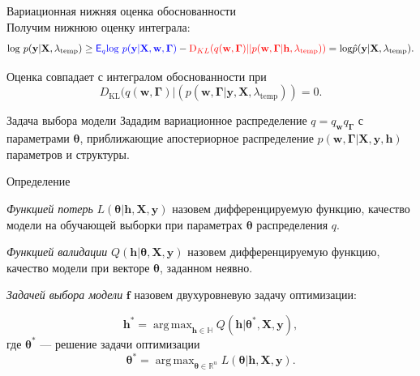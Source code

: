 \documentclass[usenames,dvipsnames,11pt,pdf,utf8,russian,aspectratio=43]{beamer}
\DeclareMathOperator*{\argmax}{arg\,max}
\begin{document}
\begin{frame}{Вариационная нижняя оценка обоснованности}
~\\Получим нижнюю оценку интеграла:
$$                                                                                                                                              
        \text{log}~p(\mathbf{y}|\mathbf{X}, \lambda_\text{temp}) \geq 
\textcolor{blue}{\mathsf{E}_q \text{log}~{p(\mathbf{y} | \mathbf{X}, \mathbf{w}, \boldsymbol{\Gamma})}} - \textcolor{red}{\text{D}_{KL}(q(\mathbf{w}, \boldsymbol{\Gamma})||p(\mathbf{w}, \boldsymbol{\Gamma}| \mathbf{h}, \lambda_\text{temp}))} = \text{log}\hat{{p}}(\mathbf{y}|\mathbf{X}, \lambda_\text{temp}).
$$ 



Оценка совпадает с интегралом обоснованности при $$D_\text{KL}(q(\mathbf{w}, \boldsymbol{\Gamma})|(p(\mathbf{w}, \boldsymbol{\Gamma}|\mathbf{y}, \mathbf{X}, \lambda_\text{temp}))=0.$$

\end{frame}      


\begin{frame}{Задача выбора модели}
\footnotesize
Зададим вариационное распределение $q=q_\mathbf{w}q_{\boldsymbol{\Gamma}}$ с параметрами $\boldsymbol{\theta}$, приближающие апостериорное распределение $p(\mathbf{w}, \boldsymbol{\Gamma}|\mathbf{X}, \mathbf{y}, \mathbf{h})$ параметров и структуры.



\begin{block}{Определение}

\textit{Функцией потерь} $L( \boldsymbol{\theta}| \mathbf{h}, \mathbf{X}, \mathbf{y})$   назовем дифференцируемую функцию, качество модели на обучающей выборки при параметрах $\boldsymbol{\theta}$ распределения $q$.
\end{block}
\begin{block}{}
\textit{Функцией валидации} $Q(\mathbf{h}| \boldsymbol{\theta}, \mathbf{X}, \mathbf{y} )$ назовем дифференцируемую функцию, качество модели при векторе $\boldsymbol{\theta}$, заданном неявно.
\end{block}
\begin{block}{}
\textit{Задачей выбора модели} $\mathbf{f}$ назовем двухуровневую задачу оптимизации:

\[
	\mathbf{h}^{*} = \argmax_{\mathbf{h} \in \mathbb{H}} Q(\mathbf{h}|  \boldsymbol{\theta}^{*}, \mathbf{X}, \mathbf{y} ),
\]
где $\boldsymbol{\theta}^{*}$ --- решение задачи оптимизации
\[
   \boldsymbol{\theta}^{*} = \argmax_{\boldsymbol{\theta} \in \mathbb{R}^u} L(\boldsymbol{\theta}|  \mathbf{h},  \mathbf{X}, \mathbf{y}).
\]
\end{block}


\end{frame}
\end{document}

